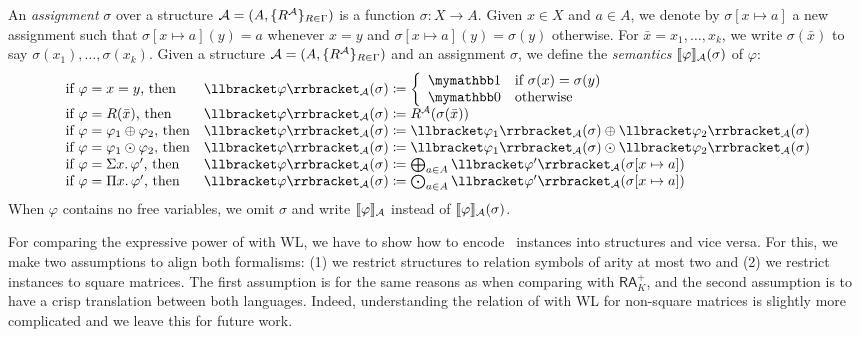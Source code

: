 An \textit{assignment} $\sigma$ over a structure $\mathcal{A} = (A, \{R^{\mathcal{A}}\}_{R \in \Gamma})$ is a function $\sigma: X \rightarrow A$. Given $x \in X$ and $a \in A$, we denote by $\sigma[x \mapsto a]$ a new assignment such that $\sigma[x \mapsto a](y) = a$ whenever $x = y$ and $\sigma[x \mapsto a](y) = \sigma(y)$ otherwise. For $\bar{x} = x_1, \ldots, x_k$,  we write $\sigma(\bar{x})$ to say $\sigma(x_1),\ldots, \sigma(x_k)$. Given a structure $\mathcal{A} = (A, \{R^{\mathcal{A}}\}_{R \in \Gamma})$ and an assignment $\sigma$, we define the \textit{semantics} $\llbracket \varphi \rrbracket_{\mathcal{A}}(\sigma)$ of $\varphi$:
$$
\begin{array}{ll}
\text{if $\varphi= x = y$, then} & \ssem{\varphi}{\cA}(\sigma)\coloneqq  
\left\{
\begin{array}{ll}
\kone & \text{if $\sigma(x) = \sigma(y)$} \\
\kzero & \text{otherwise}
\end{array}
\right. \\
\text{if $\varphi= R(\bar{x})$, then} & \ssem{\varphi}{\cA}(\sigma)\coloneqq  R^\cA(\sigma(\bar{x})) \\
\text{if $\varphi= \varphi_1 \ksum \varphi_2$, then} & \ssem{\varphi}{\cA}(\sigma)\coloneqq  \ssem{\varphi_1}{\cA}(\sigma) \ksum \ssem{\varphi_2}{\cA}(\sigma)  \\
\text{if $\varphi= \varphi_1 \kprod \varphi_2$, then} & \ssem{\varphi}{\cA}(\sigma)\coloneqq  \ssem{\varphi_1}{\cA}(\sigma) \kprod \ssem{\varphi_2}{\cA}(\sigma)  \\
\text{if $\varphi= \Sigma x. \, \varphi'$, then} & \ssem{\varphi}{\cA}(\sigma)\coloneqq   \bigksum_{a \in A} \ssem{\varphi'}{\cA}(\sigma[x \mapsto a]) \\
\text{if $\varphi= \Pi x. \, \varphi'$, then} & \ssem{\varphi}{\cA}(\sigma)\coloneqq   \bigkprod_{a \in A} \ssem{\varphi'}{\cA}(\sigma[x \mapsto a])
\end{array}
$$
When $\varphi$ contains no free variables, we omit $\sigma$ and write $\llbracket \varphi \rrbracket_{\mathcal{A}}$ instead of $\llbracket \varphi \rrbracket_{\mathcal{A}}(\sigma)$.

For comparing the expressive power of \langprod with WL, we have to show how to encode \lang\ instances into structures and vice versa. For this, we make two assumptions to align both formalisms: (1) we restrict structures to relation symbols of arity at most two and (2) we restrict instances to square matrices. The first assumption is for the same reasons as when comparing \langsum with $\mathsf{RA}_K^+$, and the second assumption is to have a crisp translation between both languages. Indeed, understanding the relation of \langprod with WL for non-square matrices is slightly more complicated and we leave this for future work. 

